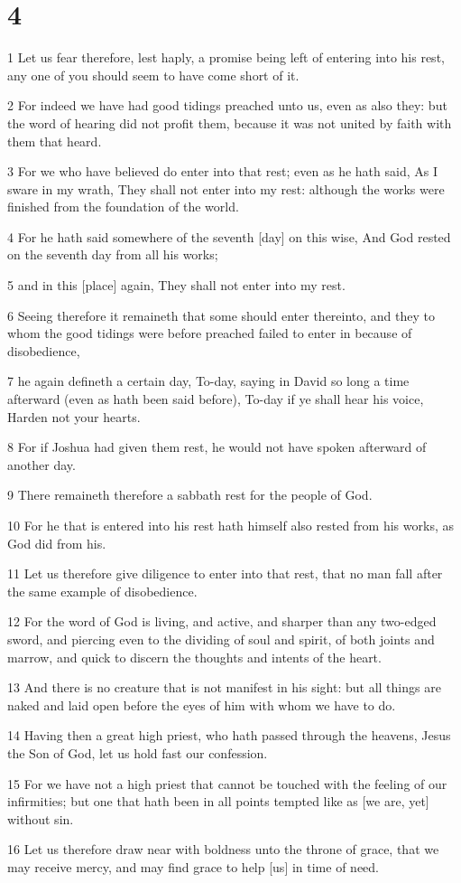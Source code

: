 \chapter{4}

\par 1 Let us fear therefore, lest haply, a promise being left of entering into his rest, any one of you should seem to have come short of it.
\par 2 For indeed we have had good tidings preached unto us, even as also they: but the word of hearing did not profit them, because it was not united by faith with them that heard.
\par 3 For we who have believed do enter into that rest; even as he hath said, As I sware in my wrath, They shall not enter into my rest: although the works were finished from the foundation of the world.
\par 4 For he hath said somewhere of the seventh [day] on this wise, And God rested on the seventh day from all his works;
\par 5 and in this [place] again, They shall not enter into my rest.
\par 6 Seeing therefore it remaineth that some should enter thereinto, and they to whom the good tidings were before preached failed to enter in because of disobedience,
\par 7 he again defineth a certain day, To-day, saying in David so long a time afterward (even as hath been said before), To-day if ye shall hear his voice, Harden not your hearts.
\par 8 For if Joshua had given them rest, he would not have spoken afterward of another day.
\par 9 There remaineth therefore a sabbath rest for the people of God.
\par 10 For he that is entered into his rest hath himself also rested from his works, as God did from his.
\par 11 Let us therefore give diligence to enter into that rest, that no man fall after the same example of disobedience.
\par 12 For the word of God is living, and active, and sharper than any two-edged sword, and piercing even to the dividing of soul and spirit, of both joints and marrow, and quick to discern the thoughts and intents of the heart.
\par 13 And there is no creature that is not manifest in his sight: but all things are naked and laid open before the eyes of him with whom we have to do.
\par 14 Having then a great high priest, who hath passed through the heavens, Jesus the Son of God, let us hold fast our confession.
\par 15 For we have not a high priest that cannot be touched with the feeling of our infirmities; but one that hath been in all points tempted like as [we are, yet] without sin.
\par 16 Let us therefore draw near with boldness unto the throne of grace, that we may receive mercy, and may find grace to help [us] in time of need.

